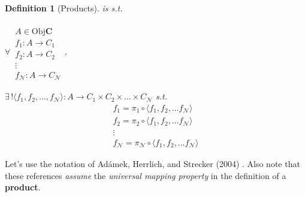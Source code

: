 \documentclass[10pt]{amsart}
\newtheorem{definition}{Definition}
\begin{document}
\begin{multicols*}{2}
\begin{definition}[Products]
	is s.t. 
	
	$\forall \, \begin{aligned}  \quad \\ 
	A \in \text{Obj}\mathbf{C} \\
	f_1 : A \to C_1 \\
	f_2 : A \to C_2 \\
	\vdots \\
	f_{\mathcal{N}} : A \to C_{\mathcal{N}} \end{aligned}$, 
	
	$\exists \, ! \langle f_1 ,f_2 , \dots , f_{\mathcal{N}} \rangle : A \to C_1 \times C_2 \times \dots \times C_{\mathcal{N}}$ s.t.
	\[
	\begin{aligned}
	f_1 = \pi_1 \circ \langle f_1 , f_2 , \dots f_{\mathcal{N}} \rangle \\ 
	f_2 = \pi_2 \circ \langle f_1 , f_2 , \dots f_{\mathcal{N}} \rangle \\ 
	\vdots  \\ 
	f_{\mathcal{N}} = \pi_{\mathcal{N}} \circ \langle f_1 , f_2 , \dots f_{\mathcal{N}} \rangle 
	\end{aligned}
	\]
\end{definition}

Let's use the notation of Ad\'{a}mek, Herrlich, and Strecker (2004) \cite{AHS2004}. Also note that these references \emph{assume} the \emph{universal mapping property} in the definition of a \textbf{product}.


\end{multicols*}
\end{document}
